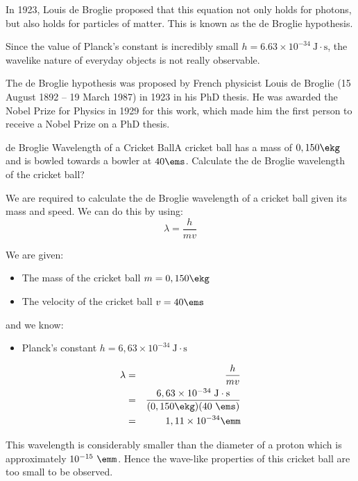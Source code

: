 In 1923, Louis de Broglie proposed that this equation not only holds for photons, but also holds for  particles of matter. This is known as the de Broglie hypothesis.
 

Since the value of Planck's constant is incredibly small $h = 6.63\times10^{-34}~\mathrm{J\cdot s}$, the wavelike nature of everyday objects is not really observable. 

\begin{IFact}
{The de Broglie hypothesis was proposed by French physicist Louis de Broglie (15 August 1892 -- 19 March 1987) in 1923 in his PhD thesis. He was awarded the Nobel Prize for Physics in 1929 for this work, which made him the first person to receive a Nobel Prize on a PhD thesis.}
\end{IFact}

\begin{wex}{de Broglie Wavelength of a Cricket Ball}{A cricket ball has a mass of $0,150\ekg$ and is bowled towards a bowler at $40\ems$. Calculate the de Broglie wavelength of the cricket ball?}
{
We are required to calculate the de Broglie wavelength of a cricket ball given its mass and speed. We can do this by using:
$$\lambda=\frac{h}{mv}$$

We are given:
\begin{itemize}
\item The mass of the cricket ball $m=0,150\ekg$
\item The velocity of the cricket ball $v=40\ems$
\end{itemize}
and we know:
\begin{itemize}
\item Planck's constant $h=6,63\times 10^{-34}~\mathrm{J\cdot s}$
\end{itemize}

\begin{eqnarray*}
\lambda&=&\frac{h}{mv}\\
&=&\frac{6,63 \times 10^{-34}\;\mathrm{J\cdot s}}{(0,150\ekg)(40~\ems)}\\
&=& 1,11 \times 10^{-34}\emm
\end{eqnarray*}
}
\end{wex}
This wavelength is considerably smaller than the diameter of a proton which is approximately $10^{-15}~\emm$. Hence the wave-like properties of this cricket ball are too small to be  observed.

